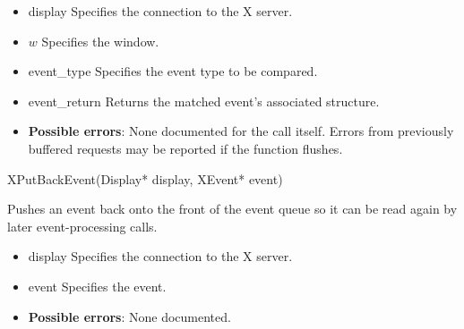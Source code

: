 \documentclass{report}
\begin{document}
\begin{itemize}
        \begin{itemize}
            \item display Specifies the connection to the X server.
            \item $w$ Specifies the window.
            \item event\_type Specifies the event type to be compared.
            \item event\_return Returns the matched event’s associated structure.
        \end{itemize}

        \begin{itemize}
            \item \textbf{Possible errors}: None documented for the call itself. Errors from previously buffered requests may be reported if the function flushes.
        \end{itemize}

        \begin{cppcode}
            XPutBackEvent(Display* display, XEvent* event)
        \end{cppcode}
        \bigbreak \noindent
        Pushes an event back onto the front of the event queue so it can be read again by later event-processing calls.

        \begin{itemize}
            \item display Specifies the connection to the X server.
            \item event Specifies the event.
        \end{itemize}

        \begin{itemize}
            \item \textbf{Possible errors}: None documented.
        \end{itemize}


\end{itemize}
\end{document}
